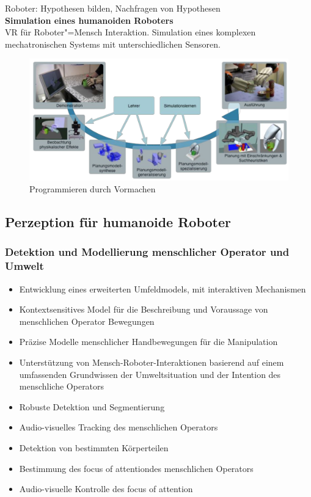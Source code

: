 Roboter: Hypothesen bilden, Nachfragen von Hypothesen\\
\textbf{Simulation eines humanoiden Roboters}\\
VR für Roboter"=Mensch Interaktion. Simulation eines komplexen mechatronischen Systems mit unterschiedlichen Sensoren.
\begin{figure}
	\centering
	\includegraphics[width=\textwidth]{figures/pdv.png}
	\caption{Programmieren durch Vormachen}
\end{figure}

\subsection{Perzeption für humanoide Roboter}

\subsubsection{Detektion und Modellierung menschlicher Operator und Umwelt}
\begin{itemize}
	\item Entwicklung eines erweiterten Umfeldmodels, mit interaktiven Mechanismen
	\item Kontextsensitives Model für die Beschreibung und Voraussage von menschlichen Operator Bewegungen
	\item Präzise Modelle menschlicher Handbewegungen für die Manipulation
	\item Unterstützung von Mensch-Roboter-Interaktionen basierend auf einem umfassenden Grundwissen der Umweltsituation und der Intention des menschliche Operators
	\item Robuste Detektion und Segmentierung
	\item Audio-visuelles Tracking des menschlichen Operators
	\item Detektion von bestimmten Körperteilen
	\item Bestimmung des \glqq focus of attention\grqq	 des menschlichen Operators
	\item Audio-visuelle Kontrolle des \glqq focus of attention\grqq
\end{itemize}

